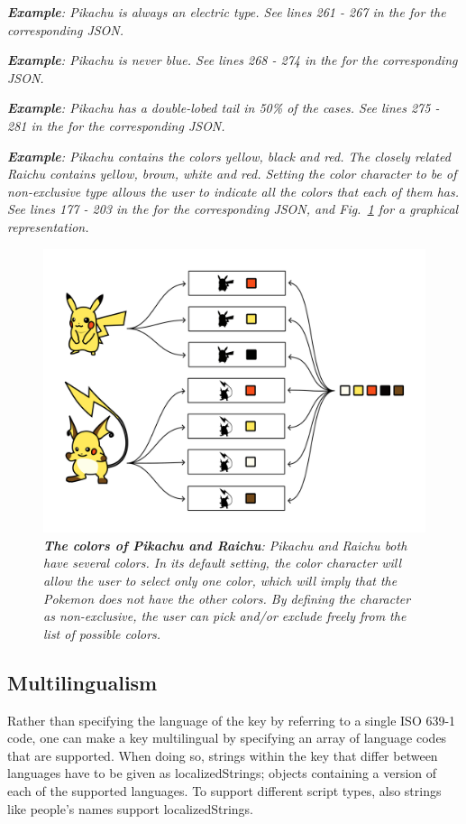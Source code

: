 \documentclass[10pt,letterpaper]{article}
\begin{document}
\textit{\textbf{Example}: Pikachu is always an electric type. See lines 261 - 267 in the  for the corresponding JSON.}

\textit{\textbf{Example}: Pikachu is never blue. See lines 268 - 274 in the  for the corresponding JSON.}

\textit{\textbf{Example}: Pikachu has a double-lobed tail in 50\% of the cases. See lines 275 - 281 in the  for the corresponding JSON.}

\textit{\textbf{Example}: Pikachu contains the colors yellow, black and red. The closely related Raichu contains yellow, brown, white and red. Setting the color character to be of non-exclusive type allows the user to indicate all the colors that each of them has. See lines 177 - 203 in the  for the corresponding JSON, and Fig.~\ref{fig4} for a graphical representation.}


\begin{figure}[!h]
  \includegraphics[width=\textwidth]{Images/Fig4}
  \caption{\textit{\textbf{The colors of Pikachu and Raichu}:
Pikachu and Raichu both have several colors. In its default setting, the color character will allow the user to select only one color, which will imply that the Pokemon does not have the other colors. By defining the character as non-exclusive, the user can pick and/or exclude freely from the list of possible colors.
}}
 \label{fig4}
\end{figure}

\subsection*{
Multilingualism
}
Rather than specifying the language of the key by referring to a single ISO 639-1 code, one can make a key multilingual by specifying an array of language codes that are supported. When doing so, strings within the key that differ between languages have to be given as localizedStrings; objects containing a version of each of the supported languages. To support different script types, also strings like people's names support localizedStrings.
\end{document}
